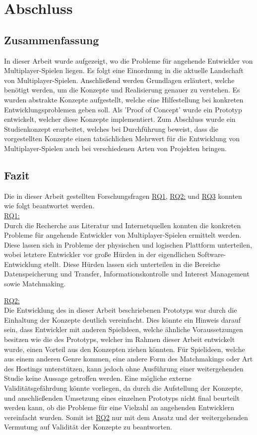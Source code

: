 \chapter{Abschluss}
\label{sec:abschluss}

\section{Zusammenfassung}

In dieser Arbeit wurde aufgezeigt, wo die Probleme für angehende Entwickler von Multiplayer-Spielen liegen. Es folgt eine Einordnung in die aktuelle Landschaft von Multiplayer-Spielen. Anschließend werden Grundlagen erläutert, welche benötigt werden, um die Konzepte und Realisierung genauer zu verstehen. Es wurden abstrakte Konzepte aufgestellt, welche eine Hilfestellung bei konkreten Entwicklungsproblemen geben soll. Als 'Proof of Concept' wurde ein Prototyp entwickelt, welcher diese Konzepte implementiert. Zum Abschluss wurde ein Studienkonzept erarbeitet, welches bei Durchführung beweist, dass die vorgestellten Konzepte einen tatsächlichen Mehrwert für die Entwicklung von Multiplayer-Spielen auch bei verschiedenen Arten von Projekten bringen.

\section{Fazit}

Die in dieser Arbeit gestellten Forschungsfragen \hyperref[RQ1]{RQ1}, \hyperref[RQ2]{RQ2:} und \hyperref[RQ3]{RQ3} konnten wie folgt beantwortet werden. \\
\hyperref[RQ1]{RQ1:} \\
Durch die Recherche aus Literatur und Internetquellen konnten die konkreten Probleme für angehende Entwickler von Multiplayer-Spielen ermittelt werden. Diese lassen sich in Probleme der physischen und logischen Plattform unterteilen, wobei letztere Entwickler vor große Hürden in der eigendlichen Software-Entwicklung stellt. Diese Hürden lassen sich unterteilen in die Bereiche Datenspeicherung und Transfer, Informationskontrolle und Interest Management sowie Matchmaking.

\hyperref[RQ2]{RQ2:} \\
Die Entwicklung des in dieser Arbeit beschriebenen Prototyps war durch die Einhaltung der Konzepte deutlich vereinfacht. Dies könnte ein Hinweis darauf sein, dass Entwickler mit anderen Spielideen, welche ähnliche Voraussetzungen besitzen wie die des Prototyps, welcher im Rahmen dieser Arbeit entwickelt wurde, einen Vorteil aus den Konzepten ziehen könnten. Für Spielideen, welche aus einem anderen Genre kommen, eine andere Form des Matchmakings oder Art des Hostings unterstützen, kann jedoch ohne Ausführung einer weitergehenden Studie keine Aussage getroffen werden. Eine mögliche externe Validitätsgefährdung könnte vorliegen, da durch die Aufstellung der Konzepte, und anschließenden Umsetzung eines einzelnen Prototyps nicht final beurteilt werden kann, ob die Probleme für eine Vielzahl an angehenden Entwicklern vereinfacht wurden. Somit ist \hyperref[RQ2]{RQ2} nur mit dem Ansatz und der weitergehenden Vermutung auf Validität der Konzepte zu beantworten.

